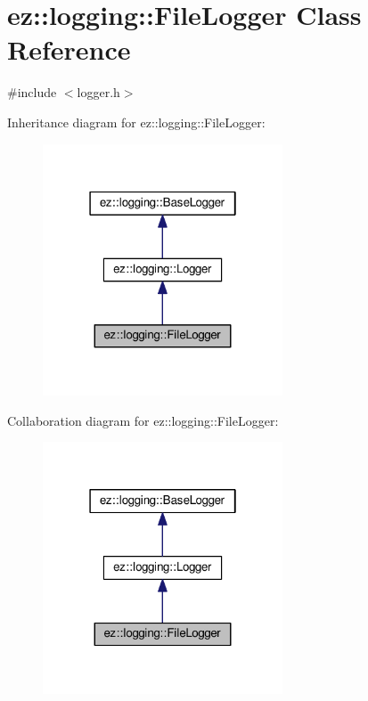 \hypertarget{classez_1_1logging_1_1FileLogger}{}\section{ez\+:\+:logging\+:\+:File\+Logger Class Reference}
\label{classez_1_1logging_1_1FileLogger}


{\ttfamily \#include $<$logger.\+h$>$}



Inheritance diagram for ez\+:\+:logging\+:\+:File\+Logger\+:
\nopagebreak
\begin{figure}[H]
\begin{center}
\leavevmode
\includegraphics[width=202pt]{classez_1_1logging_1_1FileLogger__inherit__graph}
\end{center}
\end{figure}


Collaboration diagram for ez\+:\+:logging\+:\+:File\+Logger\+:
\nopagebreak
\begin{figure}[H]
\begin{center}
\leavevmode
\includegraphics[width=202pt]{classez_1_1logging_1_1FileLogger__coll__graph}
\end{center}
\end{figure}

